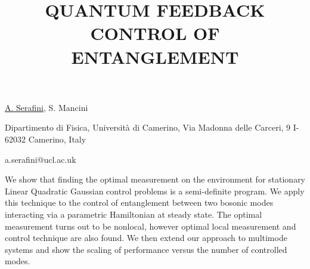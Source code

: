 \title{QUANTUM FEEDBACK CONTROL OF ENTANGLEMENT }

\underline{A. Serafini}, S. Mancini 

{\normalsize{\vspace{-4mm}
Dipartimento di Fisica, Universit\`{a} di Camerino, Via Madonna
delle Carceri, 9 I-62032 Camerino, Italy

\email a.serafini@ucl.ac.uk}}

We show that finding the optimal measurement on the environment for
stationary Linear Quadratic Gaussian control problems is a semi-definite program. We apply this technique to the control of entanglement between two bosonic modes interacting via a parametric Hamiltonian at steady state. The optimal measurement turns out to be nonlocal, however optimal local measurement and control technique are also found.
We then extend our approach to multimode systems and show the
scaling of performance versus the number of controlled modes.

\vspace{\baselineskip}